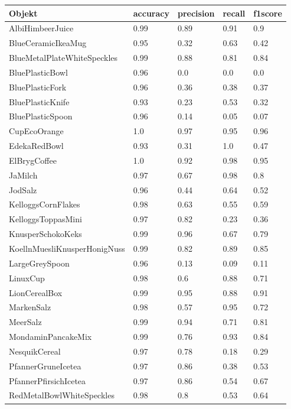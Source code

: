 \begin{table}
\begin{tabularx}{\textwidth}{Xllll}
\textbf{Objekt}	& \textbf{\gls{accuracy}} & \textbf{\gls{precision}}	& \textbf{\gls{recall}}	& \textbf{\gls{f1score}} \\ \hline
AlbiHimbeerJuice & 0.99 & 0.89 & 0.91 & 0.9 \\  
BlueCeramicIkeaMug & 0.95 & 0.32 & 0.63 & 0.42 \\  
BlueMetalPlateWhiteSpeckles & 0.99 & 0.88 & 0.81 & 0.84 \\  
BluePlasticBowl & 0.96 & 0.0 & 0.0 & 0.0 \\  
BluePlasticFork & 0.96 & 0.36 & 0.38 & 0.37 \\  
BluePlasticKnife & 0.93 & 0.23 & 0.53 & 0.32 \\  
BluePlasticSpoon & 0.96 & 0.14 & 0.05 & 0.07 \\  
CupEcoOrange & 1.0 & 0.97 & 0.95 & 0.96 \\  
EdekaRedBowl & 0.93 & 0.31 & 1.0 & 0.47 \\  
ElBrygCoffee & 1.0 & 0.92 & 0.98 & 0.95 \\  
JaMilch & 0.97 & 0.67 & 0.98 & 0.8 \\  
JodSalz & 0.96 & 0.44 & 0.64 & 0.52 \\  
KelloggsCornFlakes & 0.98 & 0.63 & 0.55 & 0.59 \\  
KelloggsToppasMini & 0.97 & 0.82 & 0.23 & 0.36 \\  
KnusperSchokoKeks & 0.99 & 0.96 & 0.67 & 0.79 \\  
KoellnMuesliKnusperHonigNuss & 0.99 & 0.82 & 0.89 & 0.85 \\  
LargeGreySpoon & 0.96 & 0.13 & 0.09 & 0.11 \\  
LinuxCup & 0.98 & 0.6 & 0.88 & 0.71 \\  
LionCerealBox & 0.99 & 0.95 & 0.88 & 0.91 \\  
MarkenSalz & 0.98 & 0.57 & 0.95 & 0.72 \\  
MeerSalz & 0.99 & 0.94 & 0.71 & 0.81 \\  
MondaminPancakeMix & 0.99 & 0.76 & 0.93 & 0.84 \\  
NesquikCereal & 0.97 & 0.78 & 0.18 & 0.29 \\  
PfannerGruneIcetea & 0.97 & 0.86 & 0.38 & 0.53 \\  
PfannerPfirsichIcetea & 0.97 & 0.86 & 0.54 & 0.67 \\  
RedMetalBowlWhiteSpeckles & 0.98 & 0.8 & 0.53 & 0.64 \\  

\end{tabularx}
\end{table}
